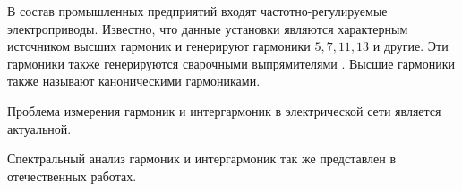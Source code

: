 В состав промышленных предприятий входят частотно-регулируемые электроприводы. Известно, что данные установки являются характерным источником высших гармоник и генерируют гармоники $5,7,11,13$ и другие. Эти гармоники также генерируются сварочными выпрямителями \cite{Calculation_Current_Mikheev_2017}. Высшие гармоники также называют каноническими гармониками.

Проблема измерения гармоник и интергармоник в электрической сети является актуальной. \cite{testa2007интергармоники, gunther2001interharmonics, 532851, testa2002interharmonic}


Спектральный анализ гармоник и интергармоник так же представлен в отечественных работах. \cite{Improving_methods_Shizma_2014,Harmonic_analysis_Goldstein2009, Development_method_Osipov_2017}



